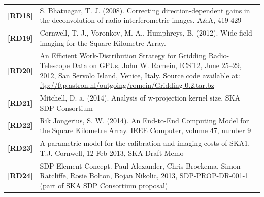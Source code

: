 \documentclass[11pt,a4paper]{article}
\begin{document}
\begin{center}
{\begin{tabularx}{\textwidth}{|l|X|}
    {\bf [RD18]} & S. Bhatnagar, T. J. (2008). Correcting direction-dependent gains in the deconvolution of radio interferometric images. A\&A, 419-429\\
    {\bf [RD19]} & Cornwell, T. J., Voronkov, M. A., Humphreys, B. (2012). Wide field imaging for the Square Kilometre Array.\\
    {\bf [RD20]} & An Efficient Work-Distribution Strategy for Gridding Radio-Telescope Data on GPUs, John W. Romein, ICS’12, June 25–29, 2012, San Servolo Island, Venice, Italy. Source code available at: \url{ftp://ftp.astron.nl/outgoing/romein/Gridding-0.2.tar.bz}\\
   {\bf [RD21]} & Mitchell, D. a. (2014). Analysis of w-projection kernel size. SKA SDP Consortium\\
   {\bf [RD22]} & Rik Jongerius, S. W. (2014). An End-to-End Computing Model for the Square Kilometre Array. IEEE Computer, volume 47, number 9\\
   {\bf [RD23]} & A parametric model for the calibration and imaging costs of SKA1, T.J. Cornwell, 12 Feb 2013, SKA Draft Memo\\
     {\bf [RD24]} & SDP Element Concept. Paul Alexander, Chris Broekema, Simon Ratcliffe, Rosie Bolton, Bojan Nikolic, 2013, SDP-PROP-DR-001-1 (part of SKA SDP Consortium proposal)\\
     \hline
   \end{tabularx}}
\end{center}
\end{document}
